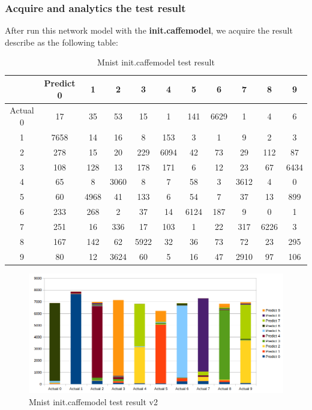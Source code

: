 \documentclass[11pt]{article}
\begin{document}
\subsubsection{Acquire and analytics the test result}
After run this network model with the \textbf{init.caffemodel}, we acquire the result describe as the following table:
\begin{table}[H]
\begin{center}
\begin{tabular}{| c | c | c | c | c | c | c | c | c | c | c |}
\hline
 & Predict 0 & 1 & 2 & 3 & 4 & 5 & 6 & 7 & 8 & 9\\
\hline
Actual 0 & 17 & 35 & 53 & 15 & 1 & 141 & 6629 & 1 & 4 & 6\\
\hline
1 & 7658 & 14 & 16 & 8 & 153 & 3 & 1 & 9 & 2 & 3\\
\hline
2 & 278 & 15 & 20 & 229 & 6094 & 42 & 73 & 29 & 112 & 87\\
\hline
3 & 108 & 128 & 13 & 178 & 171 & 6 & 12 & 23 & 67 & 6434\\
\hline
4 & 65 & 8 & 3060 & 8 & 7 & 58 & 3 & 3612 & 4 & 0\\
\hline
5 & 60 & 4968 & 41 & 133 & 6 & 54 & 7 & 37 & 13 & 899\\
\hline
6 & 233 & 268 & 2 & 37 & 14 & 6124 & 187 & 9 & 0 & 1\\
\hline
7 & 251 & 16 & 336 & 17 & 103 & 1 & 22 & 317 & 6226 & 3\\
\hline
8 & 167 & 142 & 62 & 5922 & 32 & 36 & 73 & 72 & 23 & 295\\
\hline
9 & 80 & 12 & 3624 & 60 & 5 & 16 & 47 & 2910 & 97 & 106\\

\hline
\end{tabular}
\caption {Mnist init.caffemodel test result}
\end{center}
\end{table}

\begin{figure}[H]
\centering
\includegraphics[width=1\textwidth]{images/mnist_test_result_2}
\caption{Mnist init.caffemodel test result v2}
\label{fig:samplepagoda}
\end{figure}
\end{document}
